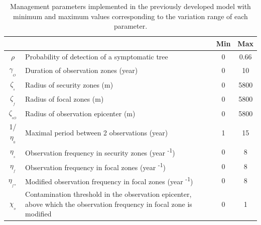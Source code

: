 \begin{table}[htbp]
		\centering
		\caption{Management parameters implemented in the previously developed model  with minimum and maximum values corresponding to the variation range of each parameter.}
		\begin{tabular}{|c|p{33.785em}|c|c|}
			\cmidrule{3-4}    \multicolumn{1}{c}{} & \multicolumn{1}{c|}{} & \textbf{Min} & \textbf{Max} \\
			\midrule
			$\rho$    & Probability of detection of a symptomatic tree & 0     & 0.66 \\
			\midrule
			$\gamma_{_O}$    & Duration of observation zones (year) & 0     & 10 \\
			\midrule
			$\zeta_{_s}$   & Radius of security zones (m) & 0     & 5800 \\
			\midrule
			$\zeta_{_f}$  & Radius of focal zones (m) & 0     & 5800 \\
			\midrule
			$\zeta_{_{eO}}$ & Radius of observation epicenter (m) & 0     & 5800 \\
			\midrule
			1/$\eta_{_0}$  & Maximal period between 2 observations (year) & 1     & 15 \\
			\midrule
			$\eta_{_s}$    & Observation frequency in security zones (year \textsuperscript{-1}) & 0     & 8 \\
			\midrule
			$\eta_{_f}$    & Observation frequency in focal zones (year \textsuperscript{-1}) & 0     & 8 \\
			\midrule
			$\eta_{_{f*}}$   & Modified observation frequency in focal zones (year \textsuperscript{-1}) & 0     & 8 \\
			\midrule
			$\chi_{_o}$    & Contamination threshold in the observation epicenter, above which the observation frequency in focal zone is modified & 0     & 1 \\
			\bottomrule
		\end{tabular}%
		\label{tab:tableparameters}%
	\end{table}%
	
